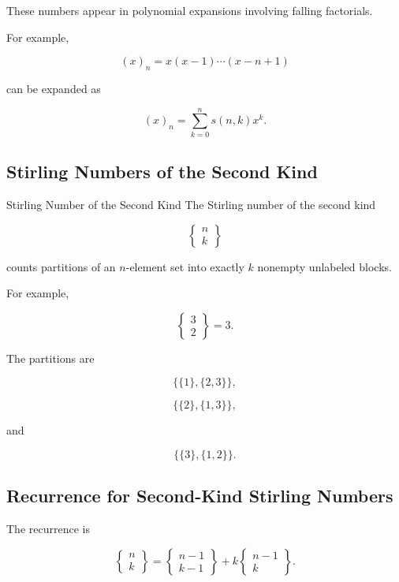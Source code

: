 These numbers appear in polynomial expansions involving falling
factorials.

For example,

\[
(x)_n
=
x(x-1)\cdots(x-n+1)
\]

can be expanded as

\[
\boxed{
(x)_n
=
\sum_{k=0}^{n}
s(n,k)x^k.
}
\]

\subsection{Stirling Numbers of the Second Kind}
\label{subsec:stirling-second-kind}

\begin{definitionbox}{Stirling Number of the Second Kind}
The Stirling number of the second kind

\[
\boxed{
\left\{
\begin{matrix}
n\\
k
\end{matrix}
\right\}
}
\]

counts partitions of an \(n\)-element set into exactly \(k\) nonempty
unlabeled blocks.
\end{definitionbox}

For example,

\[
\left\{
\begin{matrix}
3\\
2
\end{matrix}
\right\}
=3.
\]

The partitions are

\[
\{\{1\},\{2,3\}\},
\]

\[
\{\{2\},\{1,3\}\},
\]

and

\[
\{\{3\},\{1,2\}\}.
\]

\subsection{Recurrence for Second-Kind Stirling Numbers}
\label{subsec:stirling-second-recurrence}

The recurrence is

\[
\boxed{
\left\{
\begin{matrix}
n\\
k
\end{matrix}
\right\}
=
\left\{
\begin{matrix}
n-1\\
k-1
\end{matrix}
\right\}
+
k
\left\{
\begin{matrix}
n-1\\
k
\end{matrix}
\right\}.
}
\]

